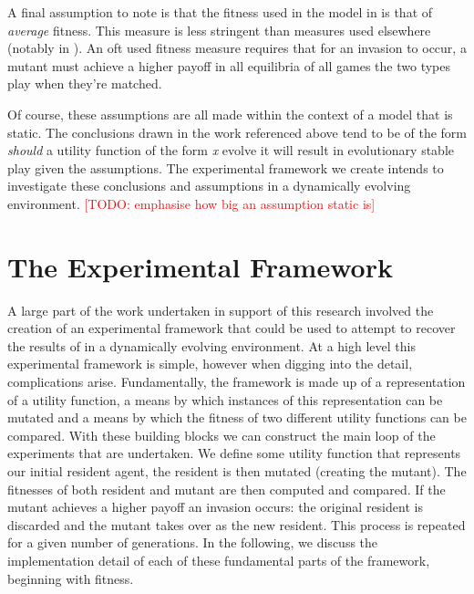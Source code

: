 \documentclass[11pt]{book}
\newcommand{\todo}[1]{\textcolor{red}{[TODO: #1]}\PackageWarning{TODO:}{#1!}}
\newcommand*{\np}{\par\noindent\newline}
\begin{document}
\np A final assumption to note is that the fitness used in the model in \citet{alger_generalization_2012} is that of \textit{average} fitness.
This measure is less stringent than measures used elsewhere (notably in \citet{alger_homo_2013}). 
An oft used fitness measure requires that for an invasion to occur, a mutant must achieve a higher payoff in all equilibria of all games the two types play when they're matched.

\np Of course, these assumptions are all made within the context of a model that is static.
The conclusions drawn in the work referenced above tend to be of the form \textit{should} a utility function of the form \textit{x} evolve it will result in evolutionary stable play given the assumptions.
The experimental framework we create intends to investigate these conclusions and assumptions in a dynamically evolving environment.
\todo{emphasise how big an assumption static is}



\section{The Experimental Framework}\label{experimentalFramework}
A large part of the work undertaken in support of this research involved the creation of an experimental framework that could be used to attempt to recover the results of \citet{alger_generalization_2012} in a dynamically evolving environment.
At a high level this experimental framework is simple, however when digging into the detail, complications arise.
Fundamentally, the framework is made up of a representation of a utility function, 
a means by which instances of this representation can be mutated and a means by which the fitness of two different utility functions can be compared.
With these building blocks we can construct the main loop of the experiments that are undertaken.
We define some utility function that represents our initial resident agent, the resident is then mutated (creating the mutant). 
The fitnesses of both resident and mutant are then computed and compared. 
If the mutant achieves a higher payoff an invasion occurs: the original resident is discarded and the mutant takes over as the new resident.
This process is repeated for a given number of generations.
In the following, we discuss the implementation detail of each of these fundamental parts of the framework, beginning with fitness.
\end{document}
